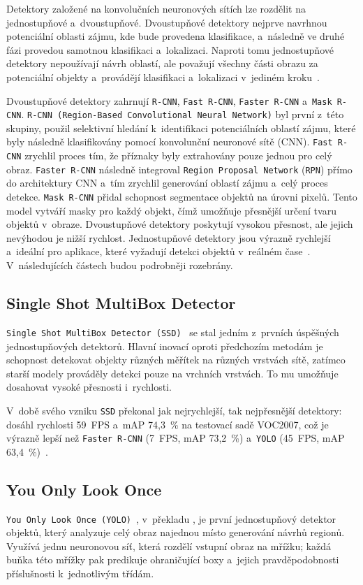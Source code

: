Detektory založené na konvolučních neuronových sítích lze rozdělit na jednostupňové a~dvoustupňové. Dvoustupňové detektory nejprve navrhnou potenciální oblasti zájmu, kde bude provedena klasifikace, a~následně ve druhé fázi provedou samotnou klasifikaci a~lokalizaci. Naproti tomu jednostupňové detektory nepoužívají návrh oblastí, ale považují všechny části obrazu za potenciální objekty a~provádějí klasifikaci a~lokalizaci v~jediném kroku~\cite{Rahaman, Alhardi}.

Dvoustupňové detektory zahrnují \texttt{R-CNN}, \texttt{Fast R-CNN}, \texttt{Faster R-CNN} a~\texttt{Mask R-CNN}. \texttt{R-CNN (Region-Based Convolutional Neural Network)} byl první z~této skupiny, použil selektivní hledání k~identifikaci potenciálních oblastí zájmu, které byly následně klasifikovány pomocí konvolunční neuronové sítě (CNN). \texttt{Fast R-CNN} zrychlil proces tím, že příznaky byly extrahovány pouze jednou pro celý obraz. \texttt{Faster R-CNN} následně integroval \texttt{Region Proposal Network} (\texttt{RPN}) přímo do architektury CNN a~tím zrychlil generování oblastí zájmu a~celý proces detekce. \texttt{Mask R-CNN} přidal schopnost segmentace objektů na úrovni pixelů. Tento model vytváří masky pro každý objekt, čímž umožňuje přesnější určení tvaru objektů v~obraze. Dvoustupňové detektory poskytují vysokou přesnost, ale jejich nevýhodou je nižší rychlost.
Jednostupňové detektory jsou výrazně rychlejší a~ideální pro aplikace, které vyžadují detekci objektů v~reálném čase~\cite{Rahaman, Alhardi}. V~následujících částech budou podrobněji rozebrány.

\subsection*{Single Shot MultiBox Detector}
\texttt{Single Shot MultiBox Detector (SSD)}~\cite{20years} se stal jedním z~prvních úspěšných jedno\-stupňových detektorů. Hlavní inovací oproti předchozím metodám je schopnost detekovat objekty různých měřítek na různých vrstvách sítě, zatímco starší modely prováděly detekci pouze na vrchních vrstvách. To mu umožňuje dosahovat vysoké přesnosti i~rychlosti.

V~době svého vzniku \texttt{SSD} překonal jak nejrychlejší, tak nejpřesnější detektory: dosáhl rychlosti 59~FPS a~mAP 74,3~\% na testovací sadě VOC2007, což je výrazně lepší než \texttt{Faster R-CNN} (7~FPS, mAP 73,2~\%) a~\texttt{YOLO} (45~FPS, mAP 63,4~\%)~\cite{SSD}.

\subsection*{You Only Look Once}
\label{yolo}
\texttt{You Only Look Once (YOLO)}~\cite{20years}, v~překladu , je první jednostupňový detektor objektů, který analyzuje celý obraz najednou místo generování návrhů regionů. Využívá jednu neuronovou síť, která rozdělí vstupní obraz na mřížku; každá buňka této mřížky pak predikuje ohraničující boxy a~jejich pravděpodobnosti příslušnosti k~jednotlivým třídám.

